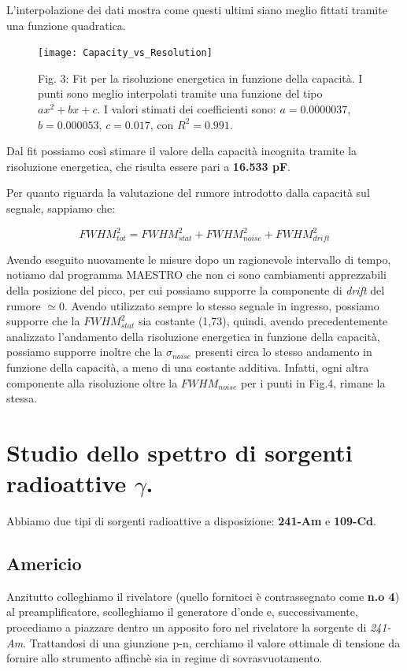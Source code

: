 \documentclass[a4paper]{article}
\begin{document}
L'interpolazione dei dati mostra come questi ultimi siano meglio fittati tramite una funzione quadratica.

\begin{figure}[!h]
\texttt{[image: Capacity\_vs\_Resolution]}
        \caption{Fig. 3: Fit per la risoluzione energetica in funzione della capacità. I punti sono meglio interpolati tramite una funzione del tipo $ax^2+bx+c$. I valori stimati dei coefficienti sono: $a = 0.0000037$, $b = 0.000053$, $c = 0.017$, con $R^2 = 0.991$.}
        \label{fig:3}
\end{figure}

\newpage

Dal fit possiamo così stimare il valore della capacità incognita tramite la risoluzione energetica, che risulta essere pari a \textbf{16.533 pF}.


Per quanto riguarda la valutazione del rumore introdotto dalla capacità sul segnale, sappiamo che:

     \begin{equation}
     FWHM_{tot}^2=FWHM_{stat}^2+FWHM_{noise}^2+FWHM_{drift}^2
     \end{equation}
     
Avendo eseguito nuovamente le misure dopo un ragionevole intervallo di tempo, notiamo dal programma MAESTRO che non ci sono cambiamenti apprezzabili della posizione del picco, per cui possiamo supporre la componente di \emph{drift} del rumore $\simeq 0$.
Avendo utilizzato sempre lo stesso segnale in ingresso, possiamo supporre che la $FWHM_{stat}^2$ sia costante (1,73), quindi, avendo precedentemente analizzato l'andamento della risoluzione energetica in funzione della capacità, possiamo supporre inoltre che la $\sigma_{noise}$ presenti circa lo stesso andamento in funzione della capacità, a meno di una costante additiva. Infatti, ogni altra componente alla risoluzione oltre la $FWHM_{noise}$ per i punti in Fig.4, rimane la stessa.

\section{Studio dello spettro di sorgenti radioattive $\gamma$.}
Abbiamo due tipi di sorgenti radioattive a disposizione: \textbf{241-Am} e \textbf{109-Cd}. 

\subsection{Americio}
Anzitutto colleghiamo il rivelatore (quello fornitoci è contrassegnato come \textbf{n.o 4}) al preamplificatore, scolleghiamo il generatore d'onde e, successivamente, procediamo a piazzare dentro un apposito foro nel rivelatore la sorgente di \textit{241-Am}.  Trattandosi di una giunzione p-n, cerchiamo il valore ottimale di tensione da fornire allo strumento affinchè sia in regime di sovrasvuotamento. 
\\
\end{document}
